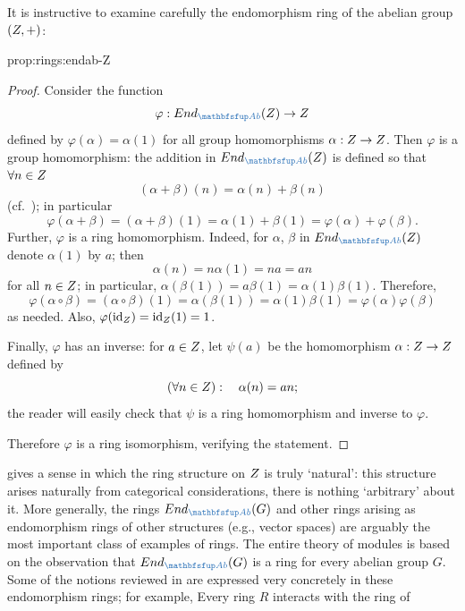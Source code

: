 It is instructive to examine carefully the endomorphism ring of the
abelian group $(Z, +)$:
\begin{prop}{}{prop:rings:endab-Z}
\end{prop}
\begin{proof}
  Consider the function
  \[
    \varphi : \End_{\categ{Ab}}(\Z) \to \Z
  \]
  defined by $\varphi(\alpha) = \alpha(1)$ for all group homomorphisms
  $\alpha : Z \to Z$. Then $\varphi$ is a group homomorphism: the
  addition in $\End_{\categ{Ab}}(\Z)$ is defined so that
  $\forall n \in Z$
  \[
    (\alpha + \beta)(n) = \alpha(n) + \beta(n)
  \]
  (cf.\ ); in
  particular
  \[
    \varphi(\alpha + \beta) = (\alpha + \beta)(1) = \alpha(1) +
    \beta(1) = \varphi(\alpha) + \varphi(\beta).
  \]
  Further, $\varphi$ is a ring homomorphism. Indeed, for $\alpha$,
  $\beta$ in $\End_{\categ{Ab}}(\Z)$ denote $\alpha(1)$ by $a$; then
  \[
    \alpha(n) = n\alpha(1) = na = an
  \]
  for all $n \in Z$; in particular,
  $\alpha(\beta(1)) = a\beta(1) = \alpha(1)\beta(1)$. Therefore,
  \[
    \varphi(\alpha \circ \beta) = (\alpha \circ \beta)(1) =
    \alpha(\beta(1)) = \alpha(1)\beta(1) =
    \varphi(\alpha)\varphi(\beta)
  \]
  as needed. Also, $\varphi(\operatorname{id}_{Z}) = \operatorname{id}_{Z}(1) = 1$.

  Finally, $\varphi$ has an inverse: for $a \in Z$, let $\psi(a)$ be
  the homomorphism $\alpha : Z \to Z$ defined by
  \[
    (\forall n \in Z) : \quad \alpha(n) = an;
  \]
  the reader will easily check that $\psi$ is a ring homomorphism and
  inverse to $\varphi$.

  Therefore $\varphi$ is a ring isomorphism, verifying the statement.
\end{proof}
 gives a sense in which the ring structure on
$Z$ is truly `natural': this structure arises naturally from
categorical considerations, there is nothing `arbitrary' about it.
More generally, the rings $\End_{\categ{Ab}}(G)$ and other rings
arising as endomorphism rings of other structures (e.g., vector
spaces) are arguably the most important class of examples of
rings. The entire theory of modules is based on the observation that
$\End_{\categ{Ab}}(G)$ is a ring for every abelian group $G$.  Some of
the notions reviewed in
 are
expressed very concretely in these endomorphism rings; for example,
  Every ring $R$ interacts with the ring of
